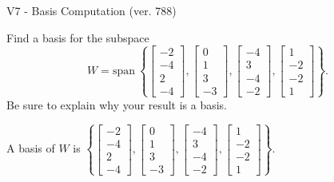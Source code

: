 \begin{exercise}
  \begin{exerciseTitle}V7 - Basis Computation (ver. 788)\end{exerciseTitle}
  \begin{exerciseStatement}
    Find a basis for the subspace 
\[W=\mathrm{span}\ \left\{\left[\begin{array}{r}
-2 \\
-4 \\
2 \\
-4
\end{array}\right] , \left[\begin{array}{r}
0 \\
1 \\
3 \\
-3
\end{array}\right] , \left[\begin{array}{r}
-4 \\
3 \\
-4 \\
-2
\end{array}\right] , \left[\begin{array}{r}
1 \\
-2 \\
-2 \\
1
\end{array}\right]\right\}.\]
 Be sure to explain why your result is a basis.


  \end{exerciseStatement}
  \begin{exerciseAnswer}
   A basis of \(W\) is  \(\left\{\left[\begin{array}{r}
-2 \\
-4 \\
2 \\
-4
\end{array}\right] , \left[\begin{array}{r}
0 \\
1 \\
3 \\
-3
\end{array}\right] , \left[\begin{array}{r}
-4 \\
3 \\
-4 \\
-2
\end{array}\right] , \left[\begin{array}{r}
1 \\
-2 \\
-2 \\
1
\end{array}\right]\right\}\).
  


  \end{exerciseAnswer}
\end{exercise}